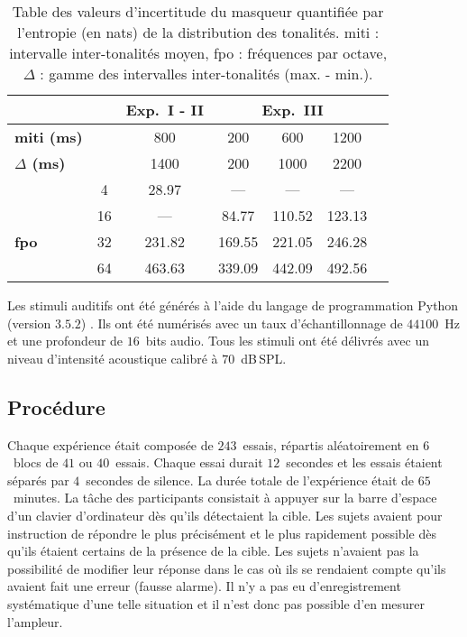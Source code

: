 \begin{table}[!t]
\caption[Table des valeurs d'incertitude du masqueur spécifiques aux trois expériences de l'Étude 1]{Table des valeurs d'incertitude du masqueur quantifiée par l'entropie (en nats) de la distribution des tonalités. miti : intervalle inter-tonalités moyen, fpo : fréquences par octave, $\Delta$ : gamme des intervalles inter-tonalités (max. - min.).}
\label{tab:entropy}
\footnotesize
\centering
\begin{tabular}{|l||*{6}{c|}}
\hline
 & & \multicolumn{1}{c|}{\textbf{Exp.~I - II}} & \multicolumn{3}{c|}{\textbf{Exp.~III}}\\
\hline
\textbf{miti (ms)}    & & 800  & 200 & 600  & 1200 \\ 
\textbf{$\Delta$ (ms)} & & 1400 & 200 & 1000 & 2200\\
\hline
                & 4  & 28.97 & ---  & ---  & ---\\
                & 16 & --- & 84.77 & 110.52 & 123.13\\
\textbf{fpo}    & 32 & 231.82& 169.55 & 221.05 & 246.28\\
                & 64 & 463.63& 339.09 & 442.09 & 492.56\\
\hline
\end{tabular}
\end{table}

Les stimuli auditifs ont été générés à l'aide du langage de programmation Python (version $3.5.2$) \citep{van2007python}.  
Ils ont été numérisés avec un taux d'échantillonnage de $44100$~Hz et une profondeur de $16$~bits audio. 
Tous les stimuli ont été délivrés avec un niveau d'intensité acoustique calibré à $70$~dB\,SPL.

\subsection{Procédure}
\label{chapitre4procedure}

Chaque expérience était composée de $243$~essais, répartis aléatoirement en $6$~blocs de $41$ ou $40$~essais. 
Chaque essai durait $12$~secondes et les essais étaient séparés par $4$~secondes de silence. 
La durée totale de l'expérience était de $65$~minutes. 
La tâche des participants consistait à appuyer sur la barre d'espace d'un clavier d'ordinateur dès qu'ils détectaient la cible. 
Les sujets avaient pour instruction de répondre le plus précisément et le plus rapidement possible dès qu'ils étaient certains de la présence de la cible. 
Les sujets n'avaient pas la possibilité de modifier leur réponse dans le cas où ils se rendaient compte qu'ils avaient fait une erreur (fausse alarme). 
Il n'y a pas eu d'enregistrement systématique d'une telle situation et il n'est donc pas possible d'en mesurer l'ampleur. 

